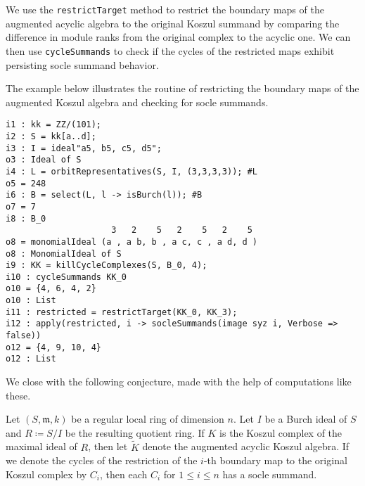 \documentclass[twoside,12pt, leqno]{amsart}
\begin{document}
We use the \texttt{restrictTarget} method to restrict the boundary maps of the augmented acyclic algebra to the original Koszul summand by comparing the difference in module ranks from the original complex to the acyclic one. We can then use \texttt{cycleSummands} to check if the cycles of the restricted maps exhibit persisting socle summand behavior.

\begin{example}
The example below illustrates the routine of restricting the boundary maps of the augmented Koszul algebra and checking for socle summands.
\end{example}
\begin{footnotesize}
\begin{verbatim}
i1 : kk = ZZ/(101);
i2 : S = kk[a..d];
i3 : I = ideal"a5, b5, c5, d5";
o3 : Ideal of S
i4 : L = orbitRepresentatives(S, I, (3,3,3,3)); #L
o5 = 248
i6 : B = select(L, l -> isBurch(l)); #B
o7 = 7
i8 : B_0
                     3   2    5   2    5   2    5
o8 = monomialIdeal (a , a b, b , a c, c , a d, d )
o8 : MonomialIdeal of S
i9 : KK = killCycleComplexes(S, B_0, 4);
i10 : cycleSummands KK_0
o10 = {4, 6, 4, 2}
o10 : List
i11 : restricted = restrictTarget(KK_0, KK_3);
i12 : apply(restricted, i -> socleSummands(image syz i, Verbose => false))
o12 = {4, 9, 10, 4}
o12 : List
\end{verbatim}
\end{footnotesize}

We close with the following conjecture, made with the help of computations like these.

\begin{conjecture}
	Let $(S, \mathfrak{m}, k)$ be a regular local ring of dimension $n$. Let $I$ be a Burch ideal of $S$ and $R \coloneqq S / I$ be the resulting quotient ring. If $K$ is the Koszul complex of the maximal ideal of $R$, then let $\widetilde{K}$ denote the augmented acyclic Koszul algebra. If we denote the cycles of the restriction of the $i$-th boundary map to the original Koszul complex by $C_i$, then each $C_i$ for $1 \leqslant i \leqslant n$ has a socle summand. 
\end{conjecture}
\end{document}
